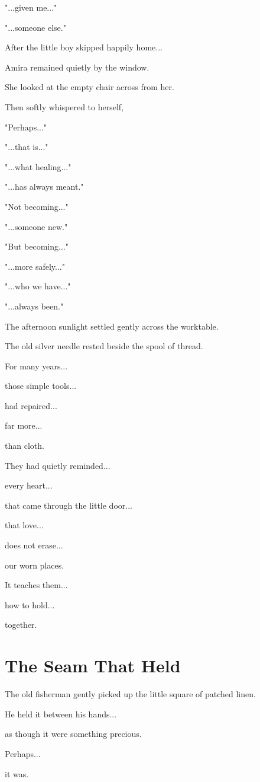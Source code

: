 \documentclass[12pt,openany]{book}
\begin{document}
"...given me..."

"...someone else."

After the little boy skipped happily home...

Amira remained quietly by the window.

She looked at the empty chair across from her.

Then softly whispered to herself,

"Perhaps..."

"...that is..."

"...what healing..."

"...has always meant."

"Not becoming..."

"...someone new."

"But becoming..."

"...more safely..."

"...who we have..."

"...always been."

The afternoon sunlight settled gently across the worktable.

The old silver needle rested beside the spool of thread.

For many years...

those simple tools...

had repaired...

far more...

than cloth.

They had quietly reminded...

every heart...

that came through the little door...

that love...

does not erase...

our worn places.

It teaches them...

how to hold...

together.
\section*{The Seam That Held}

The old fisherman gently picked up the little square of patched linen.

He held it between his hands...

as though it were something precious.

Perhaps...

it was.
\end{document}
